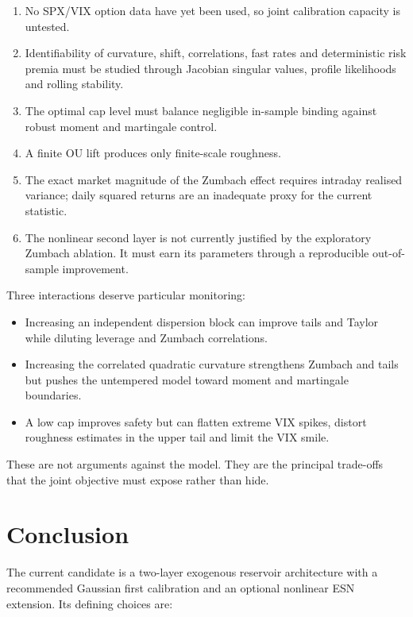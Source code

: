 \documentclass[11pt,a4paper]{article}
\begin{document}
\begin{unresolvedbox}
\begin{enumerate}
  \item No SPX/VIX option data have yet been used, so joint calibration capacity is untested.
  \item Identifiability of curvature, shift, correlations, fast rates and deterministic risk
  premia must be studied through Jacobian singular values, profile likelihoods and rolling
  stability.
  \item The optimal cap level must balance negligible in-sample binding against robust moment
  and martingale control.
  \item A finite OU lift produces only finite-scale roughness.
  \item The exact market magnitude of the Zumbach effect requires intraday realised variance;
  daily squared returns are an inadequate proxy for the current statistic.
  \item The nonlinear second layer is not currently justified by the exploratory Zumbach
  ablation.  It must earn its parameters through a reproducible out-of-sample improvement.
\end{enumerate}
\end{unresolvedbox}

Three interactions deserve particular monitoring:

\begin{itemize}
  \item Increasing an independent dispersion block can improve tails and Taylor while diluting
  leverage and Zumbach correlations.
  \item Increasing the correlated quadratic curvature strengthens Zumbach and tails but pushes
  the untempered model toward moment and martingale boundaries.
  \item A low cap improves safety but can flatten extreme VIX spikes, distort roughness
  estimates in the upper tail and limit the VIX smile.
\end{itemize}

These are not arguments against the model. They are the principal trade-offs that the joint
objective must expose rather than hide.

\section{Conclusion}

The current candidate is a two-layer exogenous reservoir architecture with a recommended
Gaussian first calibration and an optional nonlinear ESN extension. Its defining choices are:
\end{document}
